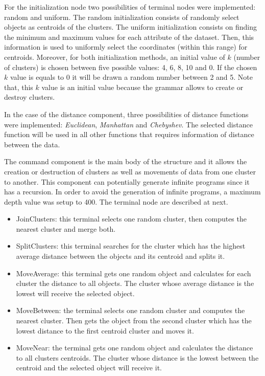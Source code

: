 \documentclass[journal]{IEEEtran}
\begin{document}
	For the initialization node two possibilities of terminal nodes were implemented: random and uniform. The random initialization consists of randomly select objects as centroids of the clusters. The uniform initialization consists on finding the minimum and maximum values for each attribute of the dataset. Then, this information is used to uniformly select the coordinates (within this range) for centroids. Moreover, for both initialization methods, an initial value of $k$ (number of clusters) is chosen between five possible values: 4, 6, 8, 10 and 0. If the chosen $k$ value is equals to 0 it will be drawn a random number between 2 and 5. Note that, this $k$ value is an initial value because the grammar allows to create or destroy clusters. 
	
	In the case of the distance component, three possibilities of distance functions were implemented: \textit{Euclidean}, \textit{Manhattan} and \textit{Chebyshev}. The selected distance function will be used in all other functions that requires information of distance between the data.
	
	The command component is the main body of the structure and it allows the creation or destruction of clusters as well as movements of data from one cluster to another. This component can potentially generate infinite programs since it has a recursion. In order to avoid the generation of infinite programs, a maximum depth value was setup to 400. The  terminal node are described at next.
	
	\begin{itemize}
		\item JoinClusters: this terminal selects one random cluster, then computes the nearest cluster and merge both.
		\item SplitClusters: this terminal searches for the cluster which has the highest average distance between the objects and its centroid and splits it. 
		\item MoveAverage:  this terminal gets one random object and calculates for each cluster the distance to all objects. The cluster whose average distance is the lowest will receive the selected object.
		\item MoveBetween: the terminal selects one random cluster and computes the nearest cluster. Then gets the object from the second cluster which has the lowest distance to the first centroid cluster and moves it.
		\item MoveNear:  the terminal gets one random object and calculates the distance to all clusters centroids. The cluster whose distance is the lowest between the centroid and the selected object will receive it.
	\end{itemize}
	
\end{document}

